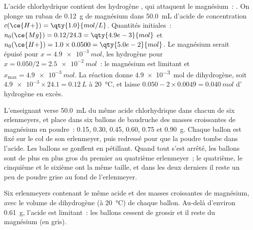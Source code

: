 \begin{example}\label{ex:g10:reaction-progress-table:magnesium}
L'acide chlorhydrique contient des  hydrogène , qui attaquent
le magnésium~: . On plonge un ruban de
\qty{0.12}{g} de magnésium dans \qty{50.0}{mL} d'acide de concentration
$c(\ce{H+}) = \qty{1.0}{mol/L}$. Quantités initiales~:
$n_0(\ce{Mg}) = 0.12/24.3 = \qty{4.9e-3}{mol}$ et
$n_0(\ce{H+}) = 1.0 \times 0.0500 = \qty{5.0e-2}{mol}$. Le magnésium
serait épuisé pour $x = \qty{4.9e-3}{mol}$, les  hydrogène pour
$x = 0.050/2 = \qty{2.5e-2}{mol}$~: le magnésium est limitant et
$x_{\max} = \qty{4.9e-3}{mol}$. La réaction donne \qty{4.9e-3}{mol} de
dihydrogène, soit $\num{4.9e-3} \times 24.1 = \qty{0.12}{L}$ à
\qty{20}{\celsius}, et laisse $0.050 - 2 \times 0.0049 =
\qty{0.040}{mol}$ d' hydrogène en excès.
\end{example}

\begin{inthelab}
L'enseignant verse \qty{50.0}{mL} du même acide chlorhydrique dans
chacun de six erlenmeyers, et place dans six ballons de baudruche des
masses croissantes de magnésium en poudre~: 0.15, 0.30, 0.45, 0.60, 0.75
et \qty{0.90}{g}. Chaque ballon est fixé sur le col de son erlenmeyer,
puis redressé pour que la poudre tombe dans l'acide. Les ballons se
gonflent en pétillant. Quand tout s'est arrêté, les ballons sont de plus
en plus gros du premier au quatrième erlenmeyer~; le quatrième, le
cinquième et le sixième ont la même taille, et dans les deux derniers
il reste un peu de poudre grise au fond de l'erlenmeyer.
\end{inthelab}

\begin{omfigure}

{\small Six erlenmeyers contenant le même acide et des masses croissantes
de magnésium, avec le volume de dihydrogène (à \qty{20}{\celsius}) de
chaque ballon. Au-delà d'environ \qty{0.61}{g}, l'acide est limitant~:
les ballons cessent de grossir et il reste du magnésium (en gris).}
\end{omfigure}

